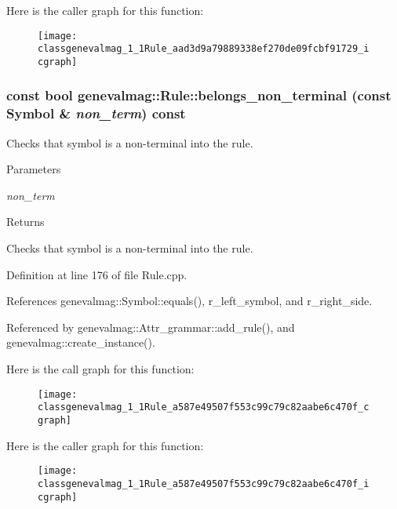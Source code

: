 Here is the caller graph for this function:\nopagebreak
\begin{figure}[H]
\begin{center}
\leavevmode
\texttt{[image: classgenevalmag\_1\_1Rule\_aad3d9a79889338ef270de09fcbf91729\_icgraph]}
\end{center}
\end{figure}


\hypertarget{classgenevalmag_1_1Rule_a587e49507f553c99c79c82aabe6c470f}{
\subsubsection[{belongs\_\-non\_\-terminal}]{\setlength{\rightskip}{0pt plus 5cm}const bool genevalmag::Rule::belongs\_\-non\_\-terminal (const {\bf Symbol} \& {\em non\_\-term}) const}}
\label{classgenevalmag_1_1Rule_a587e49507f553c99c79c82aabe6c470f}
Checks that symbol is a non-\/terminal into the rule. 
\begin{DoxyParams}{Parameters}
\item[{\em non\_\-term}]\end{DoxyParams}
\begin{DoxyReturn}{Returns}

\end{DoxyReturn}
Checks that symbol is a non-\/terminal into the rule. 

Definition at line 176 of file Rule.cpp.



References genevalmag::Symbol::equals(), r\_\-left\_\-symbol, and r\_\-right\_\-side.



Referenced by genevalmag::Attr\_\-grammar::add\_\-rule(), and genevalmag::create\_\-instance().



Here is the call graph for this function:\nopagebreak
\begin{figure}[H]
\begin{center}
\leavevmode
\texttt{[image: classgenevalmag\_1\_1Rule\_a587e49507f553c99c79c82aabe6c470f\_cgraph]}
\end{center}
\end{figure}




Here is the caller graph for this function:\nopagebreak
\begin{figure}[H]
\begin{center}
\leavevmode
\texttt{[image: classgenevalmag\_1\_1Rule\_a587e49507f553c99c79c82aabe6c470f\_icgraph]}
\end{center}
\end{figure}


